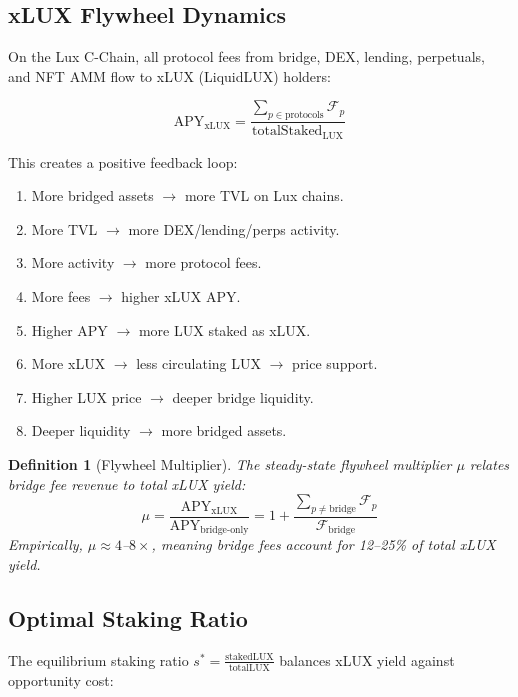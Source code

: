 \documentclass[11pt,twocolumn]{article}
\newtheorem{definition}[theorem]{Definition}
\theoremstyle{definition}
\newcommand{\Fee}{\mathcal{F}}
\begin{document}
\subsection{xLUX Flywheel Dynamics}

On the Lux C-Chain, all protocol fees from bridge, DEX, lending, perpetuals, and NFT AMM flow to xLUX (LiquidLUX) holders:

\begin{equation}
  \text{APY}_{\text{xLUX}} = \frac{\sum_{p \in \text{protocols}} \Fee_p}{\text{totalStaked}_{\text{LUX}}}
\end{equation}

This creates a positive feedback loop:

\begin{enumerate}[nosep]
  \item More bridged assets $\to$ more TVL on Lux chains.
  \item More TVL $\to$ more DEX/lending/perps activity.
  \item More activity $\to$ more protocol fees.
  \item More fees $\to$ higher xLUX APY.
  \item Higher APY $\to$ more LUX staked as xLUX.
  \item More xLUX $\to$ less circulating LUX $\to$ price support.
  \item Higher LUX price $\to$ deeper bridge liquidity.
  \item Deeper liquidity $\to$ more bridged assets.
\end{enumerate}

\begin{definition}[Flywheel Multiplier]
\label{def:flywheel}
The steady-state flywheel multiplier $\mu$ relates bridge fee revenue to total xLUX yield:
\begin{equation}
  \mu = \frac{\text{APY}_{\text{xLUX}}}{\text{APY}_{\text{bridge-only}}} = 1 + \frac{\sum_{p \neq \text{bridge}} \Fee_p}{\Fee_{\text{bridge}}}
\end{equation}
Empirically, $\mu \approx 4$--$8\times$, meaning bridge fees account for 12--25\% of total xLUX yield.
\end{definition}

\subsection{Optimal Staking Ratio}

The equilibrium staking ratio $s^* = \frac{\text{stakedLUX}}{\text{totalLUX}}$ balances xLUX yield against opportunity cost:
\end{document}
